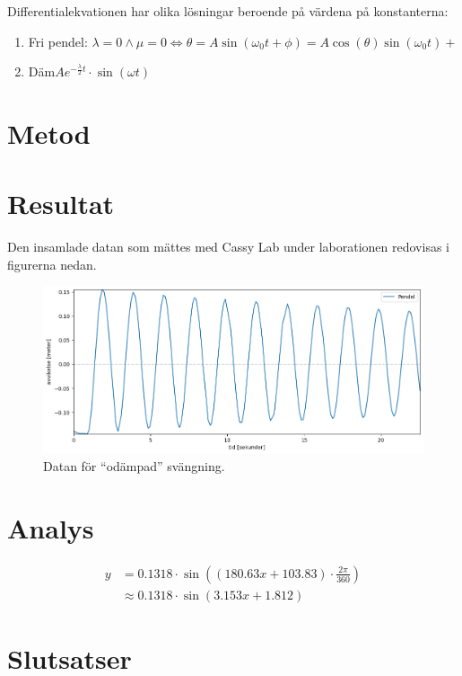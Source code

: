 \documentclass[12pt, a4paper]{article}
\begin{document}
Differentialekvationen har olika lösningar beroende på värdena på konstanterna:
\begin{enumerate}
    \item Fri pendel: $\lambda=0 \land \mu=0\Leftrightarrow\theta=A\sin(\omega_0t+\phi)=A\cos(\theta)\sin(\omega_0t)+$
    \item Däm$Ae^{-\frac{\lambda}{2}t}\cdot\sin(\omega t)$
\end{enumerate}
\section{Metod}
\section{Resultat}

Den insamlade datan som mättes med Cassy Lab under laborationen redovisas i figurerna nedan. 

\begin{figure}[hp]
    \includegraphics[width=\textwidth]{graf_egenfrekvens}
    \caption{Datan för ``odämpad'' svängning.}
\end{figure}

\section{Analys}

\begin{equation}
    \begin{split}        
        y&=0.1318\cdot\sin((180.63x+103.83)\cdot\frac{2\pi}{360})\\
        &\approx0.1318\cdot\sin(3.153x+1.812)    
    \end{split}
\end{equation}
\section{Slutsatser}
\end{document}
